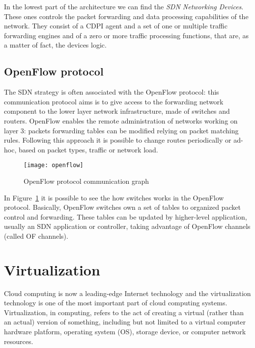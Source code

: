 In the lowest part of the architecture we can find the \emph{SDN Networking 
Devices}. These ones controls the packet forwarding and data processing 
capabilities of the network. They consist of a CDPI agent and a set of one or 
multiple traffic forwarding engines and of a zero or more traffic processing 
functions, that are, as a matter of fact, the devices logic.

\subsection{OpenFlow protocol}
The SDN strategy is often associated with the OpenFlow protocol: this 
communication protocol aims is to give access to the forwarding network 
component to the lower layer network infrastructure, made of switches and 
routers. OpenFlow enables the remote administration of networks working on 
layer 3: packets forwarding tables can be modified relying on packet matching 
rules. Following this approach it is possible to change routes periodically or 
ad-hoc, based on packet types, traffic or network load.

\begin{figure}[t]
 \centering
 \texttt{[image: openflow]}
 \caption{OpenFlow protocol communication graph}
 \label{chap:background:img:openflow_protocol}
\end{figure}

In Figure~\ref{chap:background:img:openflow_protocol} it is possible to see the
how switches works in the OpenFlow protocol. Basically, OpenFlow switches own a
set of tables to organized packet control and forwarding. These tables can be
updated by higher-level application, usually an SDN application or controller,
taking advantage of OpenFlow channels (called OF channels). 

\section{Virtualization}
Cloud computing is now a leading-edge Internet technology and the virtualization
technology is one of the most important part of cloud computing systems.
Virtualization, in computing, refers to the act of creating a virtual (rather
than an actual) version of something, including but not limited to a virtual
computer hardware platform, operating system (OS), storage device, or computer
network resources. 

